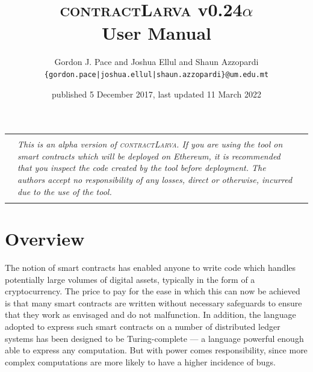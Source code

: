 \documentclass{article}
\newcommand{\contractlarva}{\textsc{contractLarva}\xspace}
\begin{document}
\title{\contractlarva v0.24$\alpha$\\User Manual}
\author{Gordon J. Pace and Joshua Ellul and Shaun Azzopardi\\\texttt{\{gordon.pace|joshua.ellul|shaun.azzopardi\}@um.edu.mt}}
\date{published 5 December 2017, last updated 11 March 2022}
\maketitle


\begin{center}
  \begin{tabular}{|lll|}\hline\qquad&&\qquad\\
    &\begin{minipage}{0.8\textwidth}
      \emph{This is an alpha version of \contractlarva. If you are using the tool on smart contracts which will be deployed on Ethereum, it is recommended that you inspect the code created by the tool before deployment. The authors accept no responsibility of any losses, direct or otherwise, incurred due to the use of the tool.}
    \end{minipage}&\\&&\\
  \hline\end{tabular} 
\end{center}



  \section{Overview}
  
  The notion of smart contracts has enabled anyone to write code which handles potentially large volumes of digital assets, typically in the form of a cryptocurrency. The price to pay for the ease in which this can now be achieved is that many smart contracts are written without necessary safeguards to ensure that they work as envisaged and do not  malfunction. In addition, the language adopted to express such smart contracts on a number of distributed ledger systems has been designed to be Turing-complete --- a language powerful enough able to express any computation. But with power comes responsibility, since more complex computations are more likely to have a higher incidence of bugs. 
\end{document}
